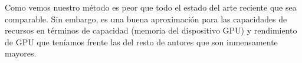 Como vemos nuestro método es peor que todo el estado del arte reciente que sea comparable. Sin embargo, es una buena aproximación para las capacidades de recursos en términos de capacidad (memoria del dispositivo GPU) y rendimiento de GPU que teníamos frente las del resto de autores que son inmensamente mayores. 
